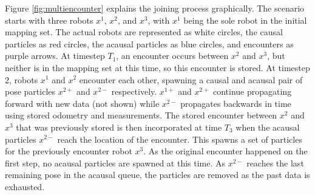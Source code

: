 Figure \ref{fig:multiencounter} explains the joining process graphically. The scenario starts with three robots $x^1$, $x^2$, and $x^3$, with $x^1$ being the sole robot in the initial mapping set. The actual robots are represented as white circles, the causal particles as red circles, the acausal particles as blue circles, and encounters as purple arrows. At timestep $T_1$, an encounter occurs between $x^2$ and $x^3$, but neither is in the mapping set at this time, so this encounter is stored. At timestep 2, robots $x^1$ and $x^2$ encounter each other, spawning a causal and acausal pair of pose particles $x^{2+}$ and $x^{2-}$ respectively. $x^{1+}$ and $x^{2+}$ continue propagating forward with new data (not shown) while $x^{2-}$ propagates backwards in time using stored odometry and measurements. The stored encounter between $x^2$ and $x^3$ that was previously stored is then incorporated at time $T_3$ when the acausal particles $x^{2-}$ reach the location of the encounter. This spawns a set of particles for the previously encounter robot $x^3$. As the original encounter happened on the first step, no acausal particles are spawned at this time. As $x^{2-}$ reaches the last remaining pose in the acausal queue, the particles are removed as the past data is exhausted.


